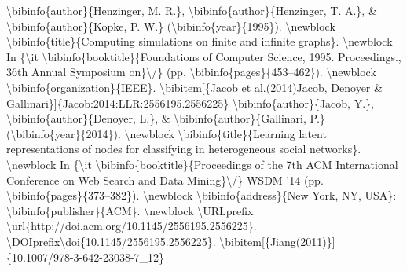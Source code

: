 \documentclass{article}%
\begin{document}
\textbackslash{}bibinfo\{author\}\{Henzinger, M. R.\}, \textbackslash{}bibinfo\{author\}\{Henzinger, T. A.\}, \&\newline%
\textbackslash{}bibinfo\{author\}\{Kopke, P. W.\} (\textbackslash{}bibinfo\{year\}\{1995\}).\newline%
\textbackslash{}newblock \textbackslash{}bibinfo\{title\}\{Computing simulations on finite and infinite graphs\}.\newline%
\textbackslash{}newblock In \{\textbackslash{}it \textbackslash{}bibinfo\{booktitle\}\{Foundations of Computer Science, 1995.\newline%
Proceedings., 36th Annual Symposium on\}\textbackslash{}/\} (pp. \textbackslash{}bibinfo\{pages\}\{453–462\}).\newline%
\textbackslash{}newblock \textbackslash{}bibinfo\{organization\}\{IEEE\}.\newline%
\textbackslash{}bibitem{[}\{Jacob et al.(2014)Jacob, Denoyer \&\newline%
Gallinari\}{]}\{Jacob:2014:LLR:2556195.2556225\}\newline%
\textbackslash{}bibinfo\{author\}\{Jacob, Y.\}, \textbackslash{}bibinfo\{author\}\{Denoyer, L.\}, \&\newline%
\textbackslash{}bibinfo\{author\}\{Gallinari, P.\} (\textbackslash{}bibinfo\{year\}\{2014\}).\newline%
\textbackslash{}newblock \textbackslash{}bibinfo\{title\}\{Learning latent representations of nodes for\newline%
classifying in heterogeneous social networks\}.\newline%
\textbackslash{}newblock In \{\textbackslash{}it \textbackslash{}bibinfo\{booktitle\}\{Proceedings of the 7th ACM International\newline%
Conference on Web Search and Data Mining\}\textbackslash{}/\} WSDM '14 (pp.\newline%
\textbackslash{}bibinfo\{pages\}\{373–382\}).\newline%
\textbackslash{}newblock \textbackslash{}bibinfo\{address\}\{New York, NY, USA\}: \textbackslash{}bibinfo\{publisher\}\{ACM\}.\newline%
\textbackslash{}newblock \textbackslash{}URLprefix \textbackslash{}url\{http://doi.acm.org/10.1145/2556195.2556225\}.\newline%
\textbackslash{}DOIprefix\textbackslash{}doi\{10.1145/2556195.2556225\}.\newline%
\textbackslash{}bibitem{[}\{Jiang(2011)\}{]}\{10.1007/978{-}3{-}642{-}23038{-}7\_12\}\newline%
\end{document}
